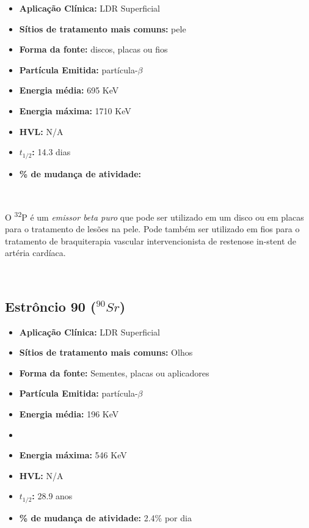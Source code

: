 \documentclass[11pt,a4paper]{article}
\begin{document}
			\begin{itemize}
				\item \textbf{Aplicação Clínica:} LDR Superficial
				\item \textbf{Sítios de tratamento mais comuns:} pele
				\item \textbf{Forma da fonte:} discos, placas ou fios
				\item \textbf{Partícula Emitida:} partícula-$\beta$
				\item \textbf{Energia média: } 695 KeV
				\item \textbf{Energia máxima: } 1710 KeV
				\item \textbf{HVL:} N/A
				\item \textbf{$t_{1/2}$:} 14.3 dias
				\item \textbf{\% de mudança de atividade: } 
			\end{itemize}

			\

			O \textsuperscript{32}P é um \textit{\textcolor{CarnationPink}{emissor beta puro}} que pode ser utilizado em um disco ou em placas para o tratamento de lesões na pele. Pode também ser utilizado em fios para o tratamento de braquiterapia vascular intervencionista de restenose in-stent de artéria cardíaca.

			\

		\subsection{Estrôncio 90 \textbf{\textcolor{CarnationPink}{(${}^{90}Sr$)}}}

			\begin{itemize}
				\item \textbf{Aplicação Clínica:} LDR Superficial
				\item \textbf{Sítios de tratamento mais comuns:} Olhos
				\item \textbf{Forma da fonte:} Sementes, placas ou aplicadores
				\item \textbf{Partícula Emitida:} partícula-$\beta$
				\item \textbf{Energia média: } 196 KeV 
				\item \item \textbf{Energia máxima: } 546 KeV
				\item \textbf{HVL:} N/A
				\item \textbf{$t_{1/2}$:} 28.9 anos
				\item \textbf{\% de mudança de atividade: } 2.4\% por dia
			\end{itemize}
\end{document}
